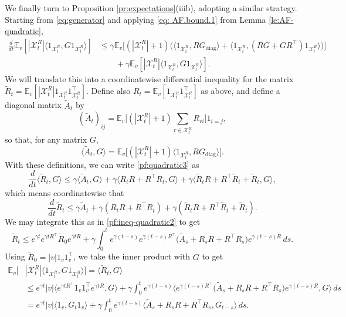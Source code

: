 \documentclass[11pt,reqno]{amsart}
\numberwithin{equation}{section}
\theoremstyle{definition}
\def\E{{\mathbb E}}
\def\X{{\mathcal X}}
\begin{document}
We finally turn to Proposition \ref{pr:expectations}(iiib), adopting a similar strategy.
Starting from \eqref{eq:generator} and applying \eqref{eq: AF.bound.1} from Lemma \ref{le:AF-quadratic},
\begin{equation}
\begin{split}
\frac{d}{dt} \E_v[|\X^{R}_t|\langle 1_{\X^{R}_t},G1_{\X^{R}_t}\rangle ] &\le \gamma \E_v\big[(|\X^{R}_t|+1)\big(\langle 1_{\X^{R}_t}, R G_{\mathrm{diag}}\rangle + \langle 1_{\X^{R}_t}, (RG+ GR^\top)1_{\X^{R}_t}\rangle\big) \big] \\
	&\qquad + \gamma \E_v[|\X^{R}_t|\langle 1_{\X^{R}_t},G1_{\X^{R}_t} \rangle].
\end{split}\label{pf:quadratic3}
\end{equation}
We will translate this into a coordinatewise differential inequality for the matrix $\widetilde{R}_t = \E_v[|\X^{R}_t|1_{\X^{R}_t}1_{\X^{R}_t}^\top]$. Define also $R_t=\E_v[1_{\X^{R}_t}1_{\X^{R}_t}^\top]$ as above, and define a diagonal matrix $\widetilde{A}_t$ by
\[
(\widetilde{A}_t)_{ij} = \E_v\bigg[(|\X^{R}_t|+1)\sum_{r \in \X^{R}_t}R_{ri}\bigg]1_{i = j},
\]
so that, for any matrix $G$,
\[
\langle \widetilde{A}_t, G\rangle = \E_v\big[(|\X^{R}_t|+1) \langle 1_{\X^{R}_t}, RG_{\mathrm{diag}}\rangle\big].
\]
With these definitions, we can write \eqref{pf:quadratic3} as
\begin{equation*}
	\frac{d}{dt}\langle\widetilde{R}_t,G\rangle
	\le
	\gamma \langle \widetilde{A}_t ,G\rangle
	+
	\gamma \langle R_tR + R^\top R_t,G\rangle
	+
	\gamma \langle \widetilde{R}_tR + R^\top \widetilde{R}_t + \widetilde{R}_t,G\rangle,
\end{equation*}
which means coordinatewise that
\[
\frac{d}{dt}\widetilde{R}_t
\le
\gamma \widetilde{A}_t
+
\gamma (R_tR + R^\top R_t)
+
\gamma (\widetilde{R}_tR + R^\top \widetilde{R}_t + \widetilde{R}_t).
\]
We may integrate this as in \eqref{pf:ineq-quadratic2} to get
\begin{equation*}
	\widetilde{R}_t
	\le
	e^{\gamma t} e^{\gamma tR^\top}\widetilde{R}_0 e^{\gamma tR}
	+
	\gamma \int_0^t e^{\gamma (t-s)}e^{\gamma (t-s)R^\top}
	\big(\widetilde{A}_s + R_sR + R^\top R_s\big)
	e^{\gamma (t-s)R} \,ds.
\end{equation*}
Using $\widetilde{R}_0=|v|1_v1_v^\top$, we take the inner product with $G$ to get
\begin{align*}
\E_v[ &|\X^{R} _t|\langle 1_{\X^{R} _t},G1_{\X^{R} _t}\rangle ] = \langle \widetilde{R}_t,G\rangle \\
	&\le e^{\gamma t}|v| \langle e^{\gamma tR^\top}1_v1_v^\top e^{\gamma tR}, G\rangle + \gamma \int_0^t e^{\gamma (t-s)} \Big\langle e^{\gamma (t-s)R^\top} \big(\widetilde{A}_s + R_sR + R^\top R_s\big) e^{\gamma (t-s)R}, G\Big\rangle \,ds \\
	&= e^{\gamma t}|v| \langle 1_v, G_t1_v\rangle + \gamma \int_0^t e^{\gamma (t-s)}\big\langle  \widetilde{A}_s + R_sR + R^\top R_s , G_{t-s}\big\rangle \,ds.
\end{align*}
\end{document}
